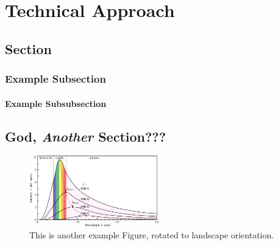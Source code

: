 \chapter{Technical Approach}
\blindtext

\section{Section}

\Blindtext

\subsection{Example Subsection}

\blindtext


\subsubsection{Example Subsubsection}

\blindtext

\section{God, \emph{Another} Section??? }

\begin{figure}
  \centering
  \includegraphics[width=0.5\textwidth]{figures/exampleFigure.png}
  \caption[Sideways Example Figure]{This is another example Figure, rotated to landscape orientation.}
  \label{LandscapeFigure}
\end{figure}
